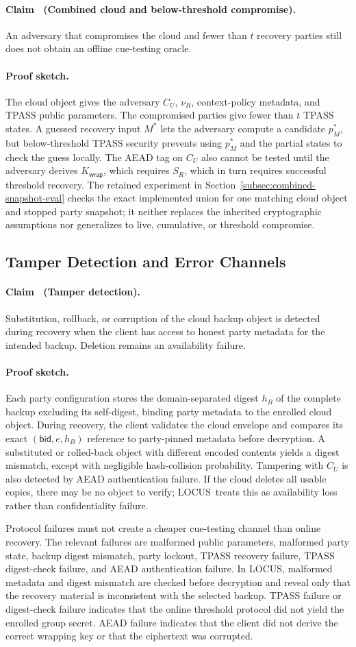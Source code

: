 \documentclass[sigconf,anonymous]{acmart}
\newcounter{protocol}
\newcommand{\LOCUS}{\textsf{LOCUS}}
\newcounter{locusclaim}
\newcommand{\locusclaim}[1]{\refstepcounter{locusclaim}\paragraph{Claim \thelocusclaim\ (#1).}}
\newcommand{\proofsketch}{\paragraph{Proof sketch.}}
\begin{document}
\locusclaim{Combined cloud and below-threshold compromise}
\label{claim:combined}
An adversary that compromises the cloud and fewer than \(t\) recovery parties still does not obtain an offline cue-testing oracle.

\proofsketch
The cloud object gives the adversary \(C_U\), \(\nu_R\), context-policy metadata, and TPASS public parameters. The compromised parties give fewer than \(t\) TPASS states. A guessed recovery input \(M^\ast\) lets the adversary compute a candidate \(p^\ast_M\), but below-threshold TPASS security prevents using \(p^\ast_M\) and the partial states to check the guess locally. The AEAD tag on \(C_U\) also cannot be tested until the adversary derives \(K_{\mathsf{wrap}}\), which requires \(S_R\), which in turn requires successful threshold recovery. The retained experiment in Section~\ref{subsec:combined-snapshot-eval} checks the exact implemented union for one matching cloud object and stopped party snapshot; it neither replaces the inherited cryptographic assumptions nor generalizes to live, cumulative, or threshold compromise.

\subsection{Tamper Detection and Error Channels}
\label{subsec:error-channels}

\locusclaim{Tamper detection}
\label{claim:tamper}
Substitution, rollback, or corruption of the cloud backup object is detected during recovery when the client has access to honest party metadata for the intended backup. Deletion remains an availability failure.

\proofsketch
Each party configuration stores the domain-separated digest \(h_B\) of the complete backup excluding its self-digest, binding party metadata to the enrolled cloud object. During recovery, the client validates the cloud envelope and compares its exact \((\mathsf{bid},e,h_B)\) reference to party-pinned metadata before decryption. A substituted or rolled-back object with different encoded contents yields a digest mismatch, except with negligible hash-collision probability. Tampering with \(C_U\) is also detected by AEAD authentication failure. If the cloud deletes all usable copies, there may be no object to verify; \LOCUS\ treats this as availability loss rather than confidentiality failure.

Protocol failures must not create a cheaper cue-testing channel than online recovery. The relevant failures are malformed public parameters, malformed party state, backup digest mismatch, party lockout, TPASS recovery failure, TPASS digest-check failure, and AEAD authentication failure. In \LOCUS, malformed metadata and digest mismatch are checked before decryption and reveal only that the recovery material is inconsistent with the selected backup. TPASS failure or digest-check failure indicates that the online threshold protocol did not yield the enrolled group secret. AEAD failure indicates that the client did not derive the correct wrapping key or that the ciphertext was corrupted.
\end{document}
